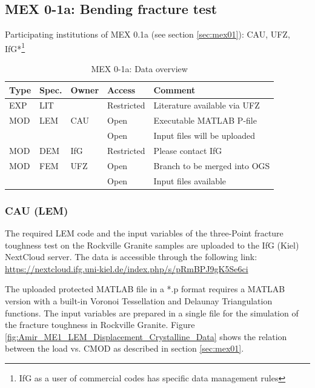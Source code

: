 \subsection{MEX 0-1a: Bending fracture test}

Participating institutions of MEX 0.1a (see section \ref{sec:mex01}): CAU, UFZ, IfG*\footnote{IfG as a user of commercial codes has specific data management rules}

\begin{table}[ht!]
\caption{MEX 0-1a: Data overview}
\label{tab:dms-mex11-overview}
\small
\begin{tabular}{l|l|l|l|L{4.7cm}}
\hline
{}
Type & Spec. & Owner                & Access     & Comment                       \\ 
\hline
EXP  & LIT   & \cite{Tarokh2016161} & Restricted & Literature available via UFZ  \\
\hline \hline
MOD  & LEM   & CAU                  & Open       & Executable MATLAB P-file      \\
     &       &                      & Open       & Input files will be uploaded  \\
\hline
MOD  & DEM   & IfG                  & Restricted & Please contact IfG            \\
\hline
MOD  & FEM   & UFZ                  & Open       & Branch to be merged into OGS  \\
     &       &                      & Open       & Input files available         \\
%
\hline
\end{tabular}
\end{table}
\normalsize

\subsubsection*{CAU (LEM)}

The required LEM code and the input variables of the three-Point fracture toughness test on the Rockville Granite samples are uploaded to the IfG (Kiel) NextCloud server. The data is accessible through the following link:\\
\url{https://nextcloud.ifg.uni-kiel.de/index.php/s/pRmBPJ9gK5Se6ci}

The uploaded protected MATLAB file in a *.p format requires a MATLAB version with a built-in Voronoi Tessellation and Delaunay Triangulation functions. The input variables are prepared in a single file for the simulation of the fracture toughness in Rockville Granite. Figure \ref{fig:Amir_ME1_LEM_Displacement_Crystalline_Data} shows the relation between the load vs. CMOD as described in section \ref {sec:mex01}.

